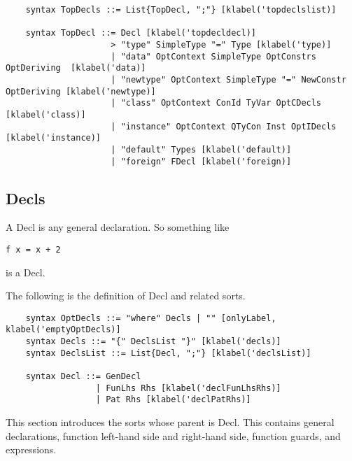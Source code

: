 \begin{lstlisting}
    syntax TopDecls ::= List{TopDecl, ";"} [klabel('topdeclslist)]

    syntax TopDecl ::= Decl [klabel('topdecldecl)]
                     > "type" SimpleType "=" Type [klabel('type)]
                     | "data" OptContext SimpleType OptConstrs OptDeriving  [klabel('data)]
                     | "newtype" OptContext SimpleType "=" NewConstr OptDeriving [klabel('newtype)]
                     | "class" OptContext ConId TyVar OptCDecls [klabel('class)]
                     | "instance" OptContext QTyCon Inst OptIDecls [klabel('instance)]
                     | "default" Types [klabel('default)]
                     | "foreign" FDecl [klabel('foreign)]
\end{lstlisting}

\subsection{Decls}

A Decl is any general declaration. So something like

\begin{lstlisting}
f x = x + 2
\end{lstlisting}

is a Decl.

The following is the definition of Decl and related sorts.

\begin{lstlisting}
    syntax OptDecls ::= "where" Decls | "" [onlyLabel, klabel('emptyOptDecls)]
    syntax Decls ::= "{" DeclsList "}" [klabel('decls)]
    syntax DeclsList ::= List{Decl, ";"} [klabel('declsList)]

    syntax Decl ::= GenDecl
                  | FunLhs Rhs [klabel('declFunLhsRhs)]
                  | Pat Rhs [klabel('declPatRhs)]
\end{lstlisting}

This section introduces the sorts whose parent is Decl. This contains general declarations, function left-hand side and right-hand side, function guards, and expressions.

